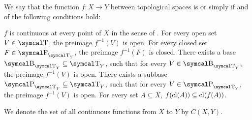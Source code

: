 \begin{definition}\label{def:global_continuity}
  We say that the function \( f: X \to Y \) between topological spaces is  or simply  if and of the following conditions hold:
  \begin{defenum}
     \( f \) is continuous at every point of \( X \) in the sense of .
     For every open set \( V \in \CT \), the preimage \( f^{-1}(V) \) is open.
     For every closed set \( F \in \CF_{\CT_Y} \), the preimage \( f^{-1}(F) \) is closed.
     There exists a base \( \CB_{\CT_Y} \subseteq \CT_Y \), such that for every \( V \in \CB_{\CT_Y} \), the preimage \( f^{-1}(V) \) is open.
     There exists a subbase \( \CP_{\CT_Y} \subseteq \CT_Y \), such that for every \( V \in \CP_{\CT_Y} \), the preimage \( f^{-1}(V) \) is open.
     For every set \( A \subseteq X \), \( f(\operatorname{cl}(A)) \subseteq \operatorname{cl}(f(A)) \).
  \end{defenum}

  We denote the set of all continuous functions from \( X \) to \( Y \) by \( C(X, Y) \).
\end{definition}
